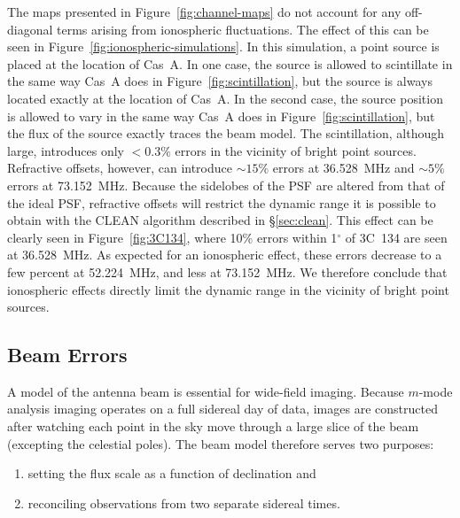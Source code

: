 \begin{bibunit}
The maps presented in Figure~\ref{fig:channel-maps} do not account for any off-diagonal terms
arising from ionospheric fluctuations. The effect of this can be seen in
Figure~\ref{fig:ionospheric-simulations}. In this simulation, a point source is placed at the
location of Cas~A. In one case, the source is allowed to scintillate in the same way Cas~A does in
Figure~\ref{fig:scintillation}, but the source is always located exactly at the location of Cas~A.
In the second case, the source position is allowed to vary in the same way Cas~A does in
Figure~\ref{fig:scintillation}, but the flux of the source exactly traces the beam model. The
scintillation, although large, introduces only $<0.3\%$ errors in the vicinity of bright point
sources. Refractive offsets, however, can introduce $\sim 15\%$ errors at 36.528~MHz and $\sim 5\%$
errors at 73.152~MHz.  Because the sidelobes of the PSF are altered from that of the ideal PSF,
refractive offsets will restrict the dynamic range it is possible to obtain with the CLEAN algorithm
described in \S\ref{sec:clean}. This effect can be clearly seen in Figure~\ref{fig:3C134}, where
10\% errors within 1$^\circ$ of 3C~134 are seen at 36.528~MHz.  As expected for an ionospheric
effect, these errors decrease to a few percent at 52.224~MHz, and less at 73.152~MHz. We therefore
conclude that ionospheric effects directly limit the dynamic range in the vicinity of bright point
sources.

\subsection{Beam Errors}

A model of the antenna beam is essential for wide-field imaging. Because $m$-mode analysis imaging
operates on a full sidereal day of data, images are constructed after watching each point in the sky
move through a large slice of the beam (excepting the celestial poles). The beam model therefore
serves two purposes:
\begin{enumerate}
    \item setting the flux scale as a function of declination and
    \item reconciling observations from two separate sidereal times.
\end{enumerate}


\end{bibunit}
